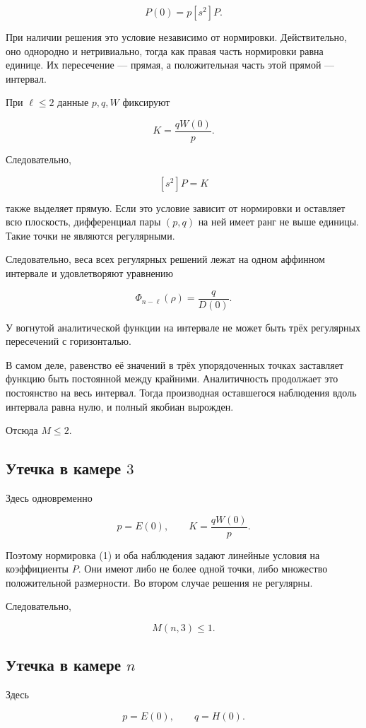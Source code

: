\documentclass[11pt,a4paper]{article}
\begin{document}
\[
P(0)=p[s^2]P.
\]

При наличии решения это условие независимо от нормировки. Действительно, оно однородно и нетривиально, тогда как правая часть нормировки равна единице. Их пересечение — прямая, а положительная часть этой прямой — интервал.

При \(\ell\le2\) данные \(p,q,W\) фиксируют

\[
K=\frac{qW(0)}p.
\]

Следовательно,

\[
[s^2]P=K
\]

также выделяет прямую. Если это условие зависит от нормировки и оставляет всю плоскость, дифференциал пары \((p,q)\) на ней имеет ранг не выше единицы. Такие точки не являются регулярными.

Следовательно, веса всех регулярных решений лежат на одном аффинном интервале и удовлетворяют уравнению

\[
\Phi_{n-\ell}(\rho)=\frac q{D(0)}.
\]

У вогнутой аналитической функции на интервале не может быть трёх регулярных пересечений с горизонталью.

В самом деле, равенство её значений в трёх упорядоченных точках заставляет функцию быть постоянной между крайними. Аналитичность продолжает это постоянство на весь интервал. Тогда производная оставшегося наблюдения вдоль интервала равна нулю, и полный якобиан вырожден.

Отсюда \(M\le2\).

\subsection*{Утечка в камере \(3\)}

Здесь одновременно

\[
p=E(0),\qquad K=\frac{qW(0)}p.
\]

Поэтому нормировка (1) и оба наблюдения задают линейные условия на коэффициенты \(P\). Они имеют либо не более одной точки, либо множество положительной размерности. Во втором случае решения не регулярны.

Следовательно,

\[
M(n,3)\le1.
\]

\subsection*{Утечка в камере \(n\)}

Здесь

\[
p=E(0),\qquad q=H(0).
\]
\end{document}
